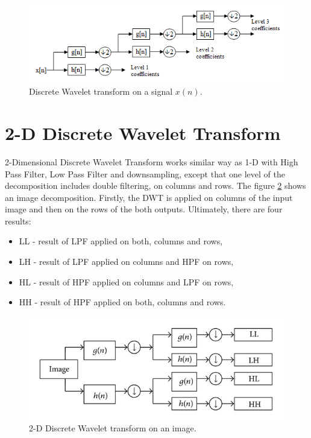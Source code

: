 \begin{figure}[h]
	\centering
	\includegraphics[width=\textwidth]{DWT.png}
	\caption{Discrete Wavelet transform on a signal $x(n)$.}
	\label{fig:DWT}
\end{figure}


\section{2-D Discrete Wavelet Transform}
\label{sec:2D_DWT}

2-Dimensional Discrete Wavelet Transform works similar way as 1-D with High Pass Filter, Low Pass Filter and downsampling, except that one level of the decomposition includes double filtering, on columns and rows. The figure \ref{fig:2D_DWT} shows an image decomposition. Firstly, the DWT is applied on columns of the input image and then on the rows of the both outputs. Ultimately, there are four results:

\begin{itemize}
\item LL - result of LPF applied on both, columns and rows,
\item LH - result of LPF applied on columns and HPF on rows,
\item HL - result of HPF applied on columns and LPF on rows,
\item HH - result of HPF applied on both, columns and rows.
\end{itemize}  

\begin{figure}[h]
	\centering
	\includegraphics[width=\textwidth]{2D_DWT.JPG}
	\caption{2-D Discrete Wavelet transform on an image.}
	\label{fig:2D_DWT}
\end{figure}

